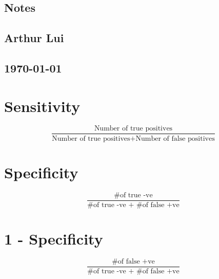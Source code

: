 \documentclass{article}                                                   %
\begin{document}
\begin{center}                                                            %
  \section*{Notes}                                                        %
  \subsection*{Arthur Lui}                                                %
  \subsection*{\noindent\today}                                           %
\end{center}                                                              %

  \section{Sensitivity}
  \[
    \frac{\text{Number of true positives}}
         {\text{Number of true positives+Number of false positives}}
  \]

  \section{Specificity}
  \[
    \frac{\text{\# of true -ve}}
         {\text{\# of true -ve + \# of false +ve}}
  \]

  \section{1 - Specificity}
  \[
    \frac{\text{\# of false +ve}}
         {\text{\# of true -ve + \# of false +ve}}
  \]

 
  
\end{document}
